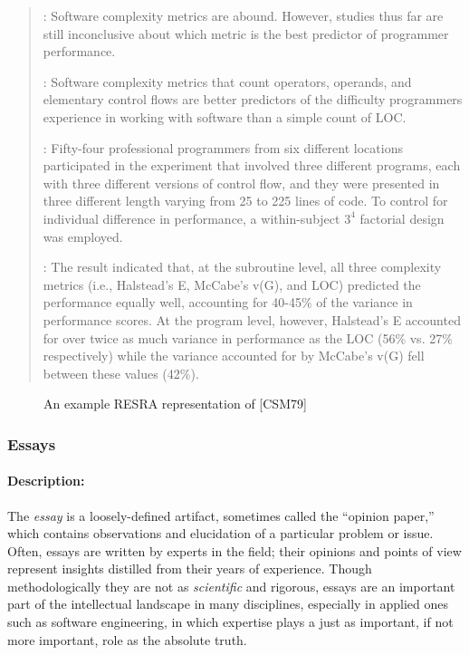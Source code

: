 \begin{itemize}
{\small
\begin{quotation}
  : Software complexity metrics are abound.
  However, studies thus far are still inconclusive about which metric is
  the best predictor of programmer performance.
  
  : Software complexity metrics that count
  operators, operands, and elementary control flows are better predictors
  of the difficulty programmers experience in working with software than a
  simple count of LOC.
  
  : Fifty-four professional programmers from six
  different locations participated in the experiment that involved three
  different programs, each with three different versions of control flow,
  and they were presented in three different length varying from 25 to 225
  lines of code. To control for individual difference in performance, a
  within-subject \( 3^4 \) factorial design was employed.
  
  : The result indicated that, at the subroutine
  level, all three complexity metrics (i.e., Halstead's E, McCabe's v(G),
  and LOC) predicted the performance equally well, accounting for 40-45\%
  of the variance in performance scores. At the program level, however,
  Halstead's E accounted for over twice as much variance in performance as
  the LOC (56\% vs. 27\% respectively) while the variance accounted for by
  McCabe's v(G) fell between these values (42\%). 
\end{quotation}
\normalsize

\begin{figure}[htb]
  \caption{An example RESRA representation of [CSM79]}
  \label{fig:curtis}
\end{figure}


\subsubsection{Essays}

\paragraph{Description:}

The {\it essay} is a loosely-defined artifact, sometimes called the
``opinion paper,'' which contains observations and elucidation of a
particular problem or issue. Often, essays are written by experts in the
field; their opinions and points of view represent insights distilled from
their years of experience. Though methodologically they are not as
{\it scientific\/} and rigorous, essays are an important part of the
intellectual landscape in many disciplines, especially in applied ones such
as software engineering, in which expertise plays a just as important, if
not more important, role as the absolute truth.

}
\end{itemize}
